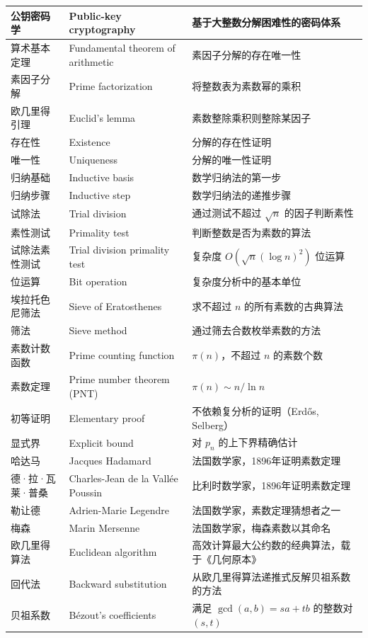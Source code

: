 \documentclass[UTF8,11pt,a4paper]{ctexbook}   %
\theoremstyle{definition}
\begin{document}
\begin{longtable}{|p{4.8cm}|p{4.8cm}|p{4.8cm}|}
公钥密码学 & Public-key cryptography & 基于大整数分解困难性的密码体系 \\
\hline
算术基本定理 & Fundamental theorem of arithmetic & 素因子分解的存在唯一性 \\
素因子分解 & Prime factorization & 将整数表为素数幂的乘积 \\
欧几里得引理 & Euclid's lemma & 素数整除乘积则整除某因子 \\
存在性 & Existence & 分解的存在性证明 \\
唯一性 & Uniqueness & 分解的唯一性证明 \\
归纳基础 & Inductive basis & 数学归纳法的第一步 \\
归纳步骤 & Inductive step & 数学归纳法的递推步骤 \\
\hline
试除法 & Trial division & 通过测试不超过 $\sqrt{n}$ 的因子判断素性 \\
素性测试 & Primality test & 判断整数是否为素数的算法 \\
试除法素性测试 & Trial division primality test & 复杂度 $O(\sqrt{n}(\log n)^2)$ 位运算 \\
位运算 & Bit operation & 复杂度分析中的基本单位 \\
埃拉托色尼筛法 & Sieve of Eratosthenes & 求不超过 $n$ 的所有素数的古典算法 \\
筛法 & Sieve method & 通过筛去合数枚举素数的方法 \\
素数计数函数 & Prime counting function & $\pi(n)$，不超过 $n$ 的素数个数 \\
素数定理 & Prime number theorem (PNT) & $\pi(n)\sim n/\ln n$ \\
初等证明 & Elementary proof & 不依赖复分析的证明（Erdős, Selberg） \\
显式界 & Explicit bound & 对 $p_n$ 的上下界精确估计 \\
哈达马 & Jacques Hadamard & 法国数学家，1896年证明素数定理 \\
德·拉·瓦莱·普桑 & Charles-Jean de la Vallée Poussin & 比利时数学家，1896年证明素数定理 \\
勒让德 & Adrien-Marie Legendre & 法国数学家，素数定理猜想者之一 \\
梅森 & Marin Mersenne & 法国数学家，梅森素数以其命名 \\
\hline
欧几里得算法 & Euclidean algorithm & 高效计算最大公约数的经典算法，载于《几何原本》 \\
回代法 & Backward substitution & 从欧几里得算法递推式反解贝祖系数的方法 \\
贝祖系数 & Bézout's coefficients & 满足 $\gcd(a,b)=sa+tb$ 的整数对 $(s,t)$ \\

\end{longtable}
\end{document}
